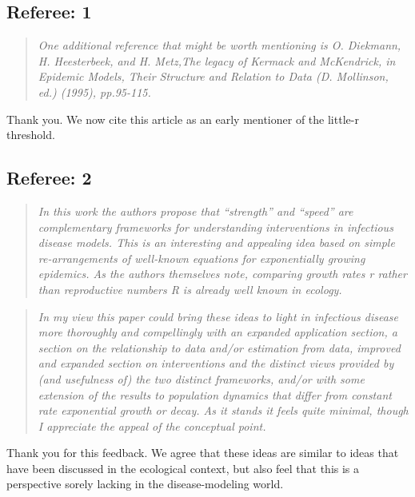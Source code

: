 
\hypertarget{referee-1}{%
\subsection{Referee: 1}\label{referee-1}}

\begin{quote}\sl
One additional reference that might be worth mentioning is O. Diekmann,
H. Heesterbeek, and H. Metz,The legacy of Kermack and McKendrick, in
Epidemic Models, Their Structure and Relation to Data (D. Mollinson,
ed.) (1995), pp.95-115.
\end{quote}

Thank you. We now cite this article as an early mentioner of the
little-r threshold.

\hypertarget{referee-2}{%
\subsection{Referee: 2}\label{referee-2}}

\begin{quote}\sl
In this work the authors propose that ``strength'' and ``speed'' are
complementary frameworks for understanding interventions in infectious
disease models. This is an interesting and appealing idea based on
simple re-arrangements of well-known equations for exponentially growing
epidemics. As the authors themselves note, comparing growth rates r
rather than reproductive numbers R is already well known in ecology.
\end{quote}

\begin{quote}\sl
In my view this paper could bring these ideas to light in infectious
disease more thoroughly and compellingly with an expanded application
section, a section on the relationship to data and/or estimation from
data, improved and expanded section on interventions and the distinct
views provided by (and usefulness of) the two distinct frameworks,
and/or with some extension of the results to population dynamics that
differ from constant rate exponential growth or decay. As it stands it
feels quite minimal, though I appreciate the appeal of the conceptual
point.
\end{quote}

Thank you for this feedback. We agree that these ideas are similar to
ideas that have been discussed in the ecological context, but also feel
that this is a perspective sorely lacking in the disease-modeling world.

